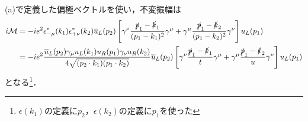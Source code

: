 (a)で定義した偏極ベクトルを使い，不変振幅は
\begin{align}
  \begin{split}
    i\mathcal{M} &= -ie^2 \epsilon^\ast_{-\mu}(k_1)\epsilon^\ast_{+\nu}(k_2) \overline{u}_L(p_2)
    \left[ \gamma^\nu \frac{\slashed{p}_1 - \slashed{k}_1}{(p_1 - k_1)^2} \gamma^\mu + \gamma^\mu \frac{\slashed{p}_1 - \slashed{k}_2}{(p_1 - k_2)^2} \gamma^\nu \right] u_L(p_1) \\
    &= -ie^2 \frac{\overline{u}_L(p_2)\gamma_\mu u_L(k_1) u_R(p_1)\gamma_\nu u_R(k_2)}{4\sqrt{(p_2 \cdot k_1)(p_1 \cdot k_2)}} \overline{u}_L(p_2)
    \left[ \gamma^\nu \frac{\slashed{p}_1 - \slashed{k}_1}{t} \gamma^\mu + \gamma^\mu \frac{\slashed{p}_1 - \slashed{k}_2}{u} \gamma^\nu \right] u_L(p_1) \\
  \end{split}
  \label{prob5_5_iM_LR-+}
\end{align}
となる\footnote{$\epsilon(k_1)$の定義に$p_2$，$\epsilon(k_2)$の定義に$p_1$を使った}．

